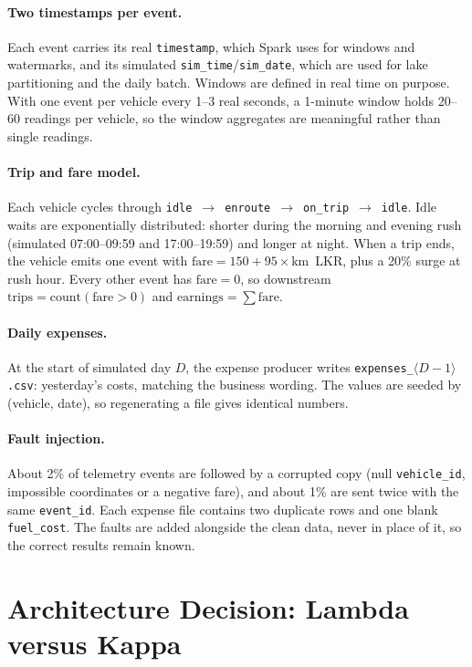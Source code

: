 \documentclass[11pt,a4paper]{article}
\newcommand{\code}[1]{\texttt{\small #1}}
\begin{document}
\paragraph{Two timestamps per event.} Each event carries its real \code{timestamp}, which Spark
uses for windows and watermarks, and its simulated \code{sim\_time}/\code{sim\_date}, which are
used for lake partitioning and the daily batch. Windows are defined in real time on purpose. With
one event per vehicle every 1--3 real seconds, a 1-minute window holds 20--60 readings per
vehicle, so the window aggregates are meaningful rather than single readings.

\paragraph{Trip and fare model.} Each vehicle cycles through
\code{idle}~$\rightarrow$~\code{enroute}~$\rightarrow$~\code{on\_trip}~$\rightarrow$~\code{idle}.
Idle waits are exponentially distributed: shorter during the morning and evening rush (simulated
07:00--09:59 and 17:00--19:59) and longer at night. When a trip ends, the vehicle emits one event
with $\text{fare} = 150 + 95\times\text{km}$~LKR, plus a 20\% surge at rush hour. Every other
event has $\text{fare}=0$, so downstream $\text{trips} = \text{count}(\text{fare}>0)$ and
$\text{earnings} = \sum\text{fare}$.

\paragraph{Daily expenses.} At the start of simulated day $D$, the expense producer writes
\code{expenses\_$\langle D{-}1\rangle$.csv}: yesterday's costs, matching the business wording.
The values are seeded by (vehicle, date), so regenerating a file gives identical numbers.

\paragraph{Fault injection.} About 2\% of telemetry events are followed by a corrupted copy
(null \code{vehicle\_id}, impossible coordinates or a negative fare), and about 1\% are sent twice
with the same \code{event\_id}. Each expense file contains two duplicate rows and one blank
\code{fuel\_cost}. The faults are added alongside the clean data, never in place of it, so the
correct results remain known.

\section{Architecture Decision: Lambda versus Kappa}
\label{sec:lambda}
\end{document}
